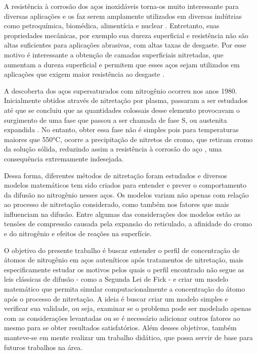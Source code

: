 A resistência à corrosão dos aços inoxidáveis torna-os muito interessante para diversas aplicações e os faz serem amplamente utilizados em diversas indútrias como petroquímica, biomédica, alimentícia e nuclear \cite{peng2018numerical}. Entretanto, suas propriedades mecânicas, por exemplo sua dureza superficial e resistência não são altas suficientes para aplicações abrasivas, com altas taxas de desgaste. Por esse motivo é interessante a obtenção de camadas superficiais nitretadas, que aumentam a dureza superficial e permitem que esses aços sejam utilizados em aplicações que exigem maior resistência ao desgaste \cite{moller2001surface}.

A descoberta dos aços supersaturados com nitrogênio ocorreu nos anos 1980. Inicialmente obtidos através de nitretação por plasma, passaram a ser estudados até que se concluiu que as quantidades colossais desse elemento provocavam o surgimento de uma fase que passou a ser chamada de fase S, ou austenita expandida \cite{christiansen2006controlled}. No entanto, obter essa fase não é simples pois para temperaturas maiores que 550°C, ocorre a precipitação de nitretos de cromo, que retiram cromo da solução sólida, reduzindo assim a resistência à corrosão do aço \cite{tschiptschin2010estrutura}, uma consequência extremamente indesejada.

Dessa forma, diferentes métodos de nitretação foram estudados e diversos modelos matemáticos tem sido criados para entender e prever o comportamento da difusão no nitrogênio nesses aços. Os modelos variam não apenas com relação ao processo de nitretação considerado, como também nos fatores que mais influenciam na difusão. Entre algumas das considerações dos modelos estão as tensões de compressão causada pela expansão do reticulado, a afinidade do cromo e do nitrogênio e efeitos de reações na superfície.

O objetivo do presente trabalho é buscar entender o perfil de concentração de átomos de nitrogênio em aços auteníticos após tratamentos de nitretação, mais especificamente estudar os motivos pelos quais o perfil encontrado não segue as leis clássicas de difusão - como a Segunda Lei de Fick - e criar um modelo matemático que permita simular computacionalmente a concentração do átomo após o processo de nitretação. A ideia é buscar criar um modelo simples e verificar sua validade, ou seja, examinar se o problema pode ser modelado apenas com as considerações levantadas ou se é necessário adicionar outros fatores ao mesmo para se obter resultados satisfatórios.
Além desses objetivos, também manteve-se em mente realizar um trabalho didático, que possa servir de base para futuros trabalhos na área.